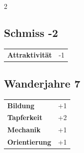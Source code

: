 \begin{multicols}{2}
\begin{tcolorbox}

\end{tcolorbox}

\begin{tcolorbox}
    \subsection*{Schmiss \hfill \small{-2 }}
    \tcblower




\begin{tabular}{@{}ll@{}}
    \textbf{Attraktivität} & -1\\
\end{tabular}


\end{tcolorbox}

\begin{tcolorbox}
    \subsection*{Wanderjahre \hfill \small{7 }}
    \tcblower




\begin{tabular}{@{}ll@{}}
    \textbf{Bildung} & +1\\
    \textbf{Tapferkeit} & +2\\
    \textbf{Mechanik} & +1\\
    \textbf{Orientierung} & +1\\
\end{tabular}


\end{tcolorbox}

\begin{tcolorbox}

\end{tcolorbox}
\end{multicols}
